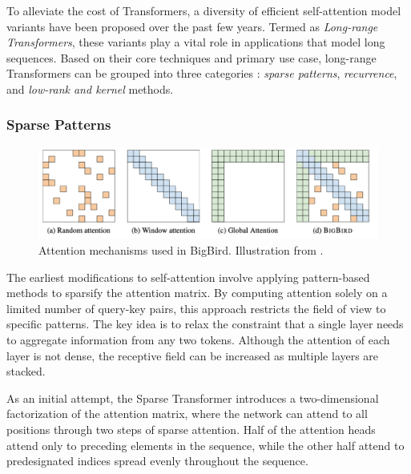 To alleviate the cost of Transformers, a diversity of efficient self-attention model variants \citep{tay2020efficient} have been proposed over the past few years. Termed as \textit{Long-range Transformers}, these variants play a vital role in applications that model long sequences. Based on their core techniques and primary use case, long-range Transformers can be grouped into three categories \citep{qin2022nlp}: \textit{sparse patterns}, \textit{recurrence}, and \textit{low-rank and kernel} methods. 

\subsubsection{Sparse Patterns}
\label{subsubsection:related-long-range-modeling-sparse}

\begin{figure}
    \centering \small
    \includegraphics[width=\textwidth]{images/chapter2/big-bird-attention.pdf}
    \caption{Attention mechanisms used in BigBird. Illustration from \citet{zaheer2020big}.}
    \label{fig:related-long-range-modeling-bigbird-attention}
\end{figure}

The earliest modifications to self-attention involve applying pattern-based methods to sparsify the attention matrix. By computing attention solely on a limited number of query-key pairs, this approach restricts the field of view to specific patterns.
The key idea is to relax the constraint that a single layer needs to aggregate information from any two tokens. Although the attention of each layer is not dense, the receptive field can be increased as multiple layers are stacked. 

As an initial attempt, the Sparse Transformer \citep{child2019generating} introduces a two-dimensional factorization of the attention matrix, where the network can attend to all positions through two steps of sparse attention. Half of the attention heads attend only to preceding elements in the sequence, while the other half attend to predesignated indices spread evenly throughout the sequence. 

